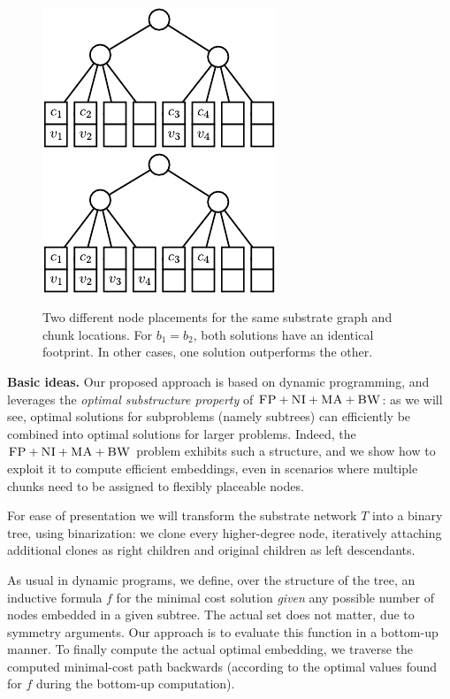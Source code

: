 \documentclass[9pt]{sigcomm-alternate}
\newcommand{\CC}{\textsc{NI}}
\newcommand{\FP}{\textsc{FP}}
\newcommand{\BW}{\textsc{BW}}
\newcommand{\MA}{\textsc{MA}}
\newcommand{\Tree}{\ensuremath{T}}
\newcommand{\CostTrans}{\ensuremath{b_1}}
\newcommand{\CostCom}{\ensuremath{b_2}}
\begin{document}
\begin{figure}
\includegraphics[width = 0.49\columnwidth]{figs/dynamic_bad}
\hfill
\includegraphics[width = 0.49\columnwidth]{figs/dynamic_good}
\caption{Two different node placements for the same substrate graph and chunk
locations. For $\CostTrans = \CostCom$, both solutions have an identical
footprint. In other cases, one solution outperforms the other.}
\label{fig:dynamic_motivation}
\end{figure}



\textbf{Basic ideas.} Our proposed approach is based on dynamic programming, and
leverages the \emph{optimal substructure property} of $\FP+\CC+\MA+\BW$:
as we will see, optimal solutions for subproblems (namely subtrees)
can efficiently be combined into optimal solutions for larger problems.
Indeed, the $\FP+\CC+\MA+\BW$ problem
exhibits such a structure, and we show how to exploit it to
compute efficient embeddings, even in scenarios where multiple chunks
need to be assigned to flexibly placeable nodes.

For ease of presentation we will transform the
substrate network $\Tree$
into a binary tree, using binarization:
we clone every higher-degree node,
iteratively attaching additional clones as right children
and original children as left descendants.

As usual in dynamic programs, we define, over the structure of the tree, an inductive formula $f$ for
the minimal cost solution \emph{given} any possible number of nodes
embedded in a given subtree. The actual set does not matter,
due to symmetry arguments.
Our approach is to evaluate this function in a bottom-up
manner.
To finally compute the actual optimal embedding,
we traverse the computed minimal-cost path backwards
(according to
the optimal values found for $f$ during the bottom-up computation).
\end{document}
